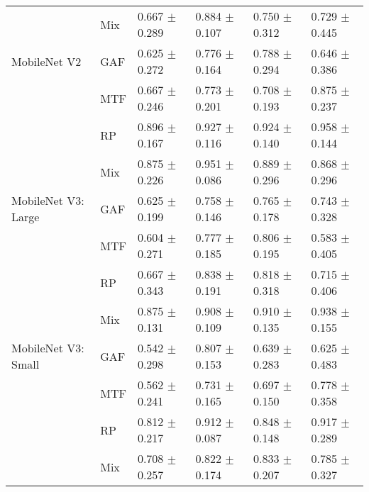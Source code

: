\begin{longtable}[t]{llllll}
 & Mix & 0.667 $\pm$ 0.289 & 0.884 $\pm$ 0.107 & 0.750 $\pm$ 0.312 & 0.729 $\pm$ 0.445 \\
MobileNet V2 & GAF & 0.625 $\pm$ 0.272 & 0.776 $\pm$ 0.164 & 0.788 $\pm$ 0.294 & 0.646 $\pm$ 0.386 \\
 & MTF & 0.667 $\pm$ 0.246 & 0.773 $\pm$ 0.201 & 0.708 $\pm$ 0.193 & 0.875 $\pm$ 0.237 \\
 & RP & 0.896 $\pm$ 0.167 & 0.927 $\pm$ 0.116 & 0.924 $\pm$ 0.140 & 0.958 $\pm$ 0.144 \\
 & Mix & 0.875 $\pm$ 0.226 & 0.951 $\pm$ 0.086 & 0.889 $\pm$ 0.296 & 0.868 $\pm$ 0.296 \\
MobileNet V3: Large & GAF & 0.625 $\pm$ 0.199 & 0.758 $\pm$ 0.146 & 0.765 $\pm$ 0.178 & 0.743 $\pm$ 0.328 \\
 & MTF & 0.604 $\pm$ 0.271 & 0.777 $\pm$ 0.185 & 0.806 $\pm$ 0.195 & 0.583 $\pm$ 0.405 \\
 & RP & 0.667 $\pm$ 0.343 & 0.838 $\pm$ 0.191 & 0.818 $\pm$ 0.318 & 0.715 $\pm$ 0.406 \\
 & Mix & 0.875 $\pm$ 0.131 & 0.908 $\pm$ 0.109 & 0.910 $\pm$ 0.135 & 0.938 $\pm$ 0.155 \\
MobileNet V3: Small & GAF & 0.542 $\pm$ 0.298 & 0.807 $\pm$ 0.153 & 0.639 $\pm$ 0.283 & 0.625 $\pm$ 0.483 \\
 & MTF & 0.562 $\pm$ 0.241 & 0.731 $\pm$ 0.165 & 0.697 $\pm$ 0.150 & 0.778 $\pm$ 0.358 \\
 & RP & 0.812 $\pm$ 0.217 & 0.912 $\pm$ 0.087 & 0.848 $\pm$ 0.148 & 0.917 $\pm$ 0.289 \\
 & Mix & 0.708 $\pm$ 0.257 & 0.822 $\pm$ 0.174 & 0.833 $\pm$ 0.207 & 0.785 $\pm$ 0.327 \\
\end{longtable}
